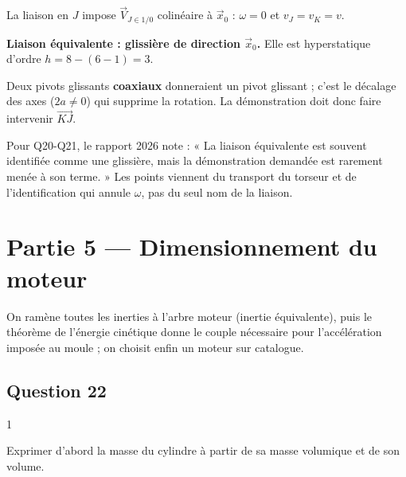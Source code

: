 \documentclass[11pt,a4paper]{article}
\newcommand{\equationajustee}[1]{%
  \sbox{\boiteequation}{$\displaystyle #1$}%
  \ifdim\wd\boiteequation>\linewidth
    \[\resizebox{\linewidth}{!}{\usebox{\boiteequation}}\]%
  \else
    \[#1\]%
  \fi}
\begin{document}
La liaison en \(J\) impose \(\vec V_{J\in1/0}\) colinéaire à \(\vec x_0\) : \(\omega=0\) et \(v_J=v_K=v\).

\equationajustee{\{V_{1/0}\}_{eq}=\left\{\begin{matrix}0 & v\\ 0 & 0\\ 0 & 0\end{matrix}\right\}_{\forall P}}

\textbf{Liaison équivalente : glissière de direction \(\vec x_0\).} Elle est hyperstatique d'ordre \(h=8-(6-1)=3\).

\begin{piege}

Deux pivots glissants \textbf{coaxiaux} donneraient un pivot glissant ; c'est le décalage des axes (\(2a\neq0\)) qui supprime la rotation. La démonstration doit donc faire intervenir \(\vec{KJ}\).

\end{piege}

\begin{jury}

Pour Q20-Q21, le rapport 2026 note : « La liaison équivalente est souvent identifiée comme une glissière, mais la démonstration demandée est rarement menée à son terme. » Les points viennent du transport du torseur et de l'identification qui annule \(\omega\), pas du seul nom de la liaison.

\end{jury}

\hypertarget{partie-5-dimensionnement-du-moteur}{%
\section{Partie 5 --- Dimensionnement du moteur}\label{partie-5-dimensionnement-du-moteur}}

On ramène toutes les inerties à l'arbre moteur (inertie équivalente), puis le théorème de l'énergie cinétique donne le couple nécessaire pour l'accélération imposée au moule ; on choisit enfin un moteur sur catalogue.

\hypertarget{question-22}{%
\subsection{Question 22}\label{question-22}}

\begin{indication}{1}

Exprimer d'abord la masse du cylindre à partir de sa masse volumique et de son volume.

\end{indication}
\end{document}
